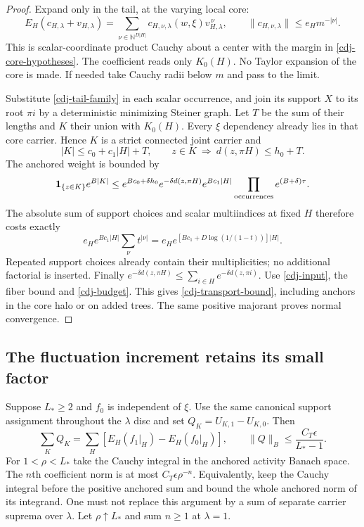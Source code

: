 \begin{proof}
Expand only in the tail, at the varying local core:
\[
 E_H(c_{H,\lambda}+v_{H,\lambda})
  =\sum_{\nu\in\mathbb N^{D|H|}}
     c_{H,\nu,\lambda}(w,\xi)v_{H,\lambda}^{\,\nu},
 \qquad
 \|c_{H,\nu,\lambda}\|\le e_Hm^{-|\nu|}.
\]
This is scalar-coordinate product Cauchy about a center with
the margin in \eqref{cdj-core-hypotheses}. The coefficient reads
only $K_0(H)$. No Taylor expansion of the core is made.
If needed take Cauchy radii below $m$ and pass to the limit.

Substitute \eqref{cdj-tail-family} in each scalar occurrence,
and join its support $X$ to its root $\pi i$ by a deterministic
minimizing Steiner graph. Let $T$ be the sum of their lengths
and $K$ their union with $K_0(H)$. Every $\xi$ dependency
already lies in that core carrier. Hence $K$ is a strict
connected joint carrier and
\[
 |K|\le c_0+c_1|H|+T,\qquad
 z\in K\ \Longrightarrow\ d(z,\pi H)\le h_0+T.
\]
The anchored weight is bounded by
\[
 \mathbf1_{\{z\in K\}}e^{B|K|}
 \le e^{Bc_0+\delta h_0}e^{-\delta d(z,\pi H)}
      e^{Bc_1|H|}
      \prod_{\rm occurrences}e^{(B+\delta)\tau}.
\]
The absolute sum of support choices and scalar multiindices
at fixed $H$ therefore costs exactly
\[
 e_H e^{Bc_1|H|}\sum_\nu t^{|\nu|}
   =e_He^{[Bc_1+D\log(1/(1-t))]|H|}.
\]
Repeated support choices already contain their multiplicities;
no additional factorial is inserted. Finally
$e^{-\delta d(z,\pi H)}
\le\sum_{i\in H}e^{-\delta d(z,\pi i)}$.
Use \eqref{cdj-input}, the fiber bound and
\eqref{cdj-budget}. This gives \eqref{cdj-transport-bound},
including anchors in the core halo or on added trees.
The same positive majorant proves normal convergence.
\end{proof}

\subsection{The fluctuation increment retains its small factor}
\label{cdj-increment-section}

Suppose $L_*\ge2$ and $f_0$ is independent of $\xi$. Use the
same canonical support assignment throughout the $\lambda$ disc
and set $Q_K=U_{K,1}-U_{K,0}$. Then
\begin{equation}\label{cdj-Cauchy-increment}
 \sum_KQ_K=\sum_H[E_H(f_1|_H)-E_H(f_0|_H)],
 \qquad
 \|Q\|_B\le \frac{C_T\epsilon}{L_*-1}.
\end{equation}
For $1<\rho<L_*$ take the Cauchy integral in the anchored
activity Banach space. The $n$th coefficient norm is at most
$C_T\epsilon\rho^{-n}$. Equivalently, keep the Cauchy integral
before the positive anchored sum and bound the whole anchored
norm of its integrand. One must not replace this argument
by a sum of separate carrier suprema over $\lambda$.
Let $\rho\uparrow L_*$ and sum $n\ge1$ at $\lambda=1$.

